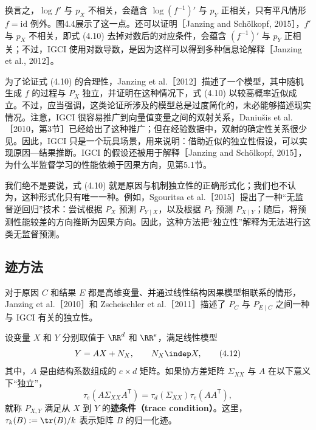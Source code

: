 

换言之，$\log f'$ 与 $p_X$ 不相关，会蕴含 $\log(f^{-1})'$ 与 $p_Y$ 正相关，只有平凡情形 $f=\mathrm{id}$ 例外。图4.4展示了这一点。还可以证明［Janzing and Schölkopf, 2015］，$f'$ 与 $p_X$ 不相关，即式 (4.10) 去掉对数后的对应条件，会蕴含 $(f^{-1})'$ 与 $p_Y$ 正相关；不过，IGCI 使用对数导数，是因为这样可以得到多种信息论解释［Janzing et al., 2012］。

为了论证式 (4.10) 的合理性，Janzing et al.［2012］描述了一个模型，其中随机生成 $f$ 的过程与 $P_X$ 独立，并证明在这种情况下，式 (4.10) 以较高概率近似成立。不过，应当强调，这类论证所涉及的模型总是过度简化的，未必能够描述现实情况。注意，IGCI 很容易推广到向量值变量之间的双射关系，Daniušis et al.［2010，第3节］已经给出了这种推广；但在经验数据中，双射的确定性关系很少见。因此，IGCI 只是一个玩具场景，用来说明：借助近似的独立性假设，可以实现原因—结果推断。IGCI 的假设还被用于解释［Janzing and Schölkopf, 2015］，为什么半监督学习的性能依赖于因果方向，见第5.1节。

我们绝不是要说，式 (4.10) 就是原因与机制独立性的正确形式化；我们也不认为，这种形式化只有唯一一种。例如，Sgouritsa et al.［2015］提出了一种“无监督逆回归”技术：尝试根据 $P_X$ 预测 $P_{Y\mid X}$，以及根据 $P_Y$ 预测 $P_{X\mid Y}$；随后，将预测性能较差的方向推断为因果方向。因此，这种方法把“独立性”解释为无法进行这类无监督预测。

\subsection{迹方法}

对于原因 $C$ 和结果 $E$ 都是高维变量、并通过线性结构因果模型相联系的情形，Janzing et al.［2010］和 Zscheischler et al.［2011］描述了 $P_C$ 与 $P_{E\mid C}$ 之间一种与 IGCI 有关的独立性。

\begin{definition}[迹条件]
设变量 $X$ 和 $Y$ 分别取值于 $\RR^d$ 和 $\RR^e$，满足线性模型
\begin{equation}
 Y=AX+N_X,\qquad N_X\indep X,
 \tag{4.12}
\end{equation}
其中，$A$ 是由结构系数组成的 $e\times d$ 矩阵。如果协方差矩阵 $\Sigma_{XX}$ 与 $A$ 在以下意义下“独立”，
\begin{equation}
 \tau_e(A\Sigma_{XX}A^{\mathsf T})
 =\tau_d(\Sigma_{XX})\tau_e(AA^{\mathsf T}),
 \tag{4.13}
\end{equation}
就称 $P_{X,Y}$ 满足从 $X$ 到 $Y$ 的\textbf{迹条件（trace condition）}。这里，$\tau_k(B):=\tr(B)/k$ 表示矩阵 $B$ 的归一化迹。
\end{definition}

